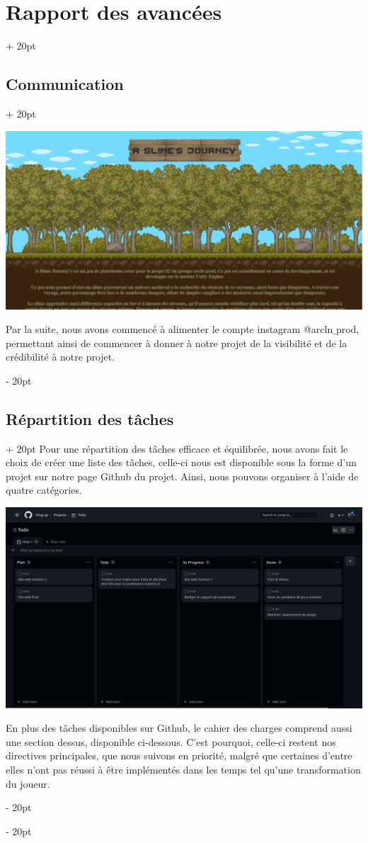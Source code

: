 \documentclass[a4paper, 12pt, twoside]{article}
\newcommand{\ind}[1][20pt]{\advance\leftskip + #1}
\newcommand{\deind}[1][20pt]{\advance\leftskip - #1}
\newenvironment{indt}[2][20pt]{#2 \par \ind[#1]}{\par \deind} %
\begin{document}
\begin{indt}{\section{Rapport des avancées}}
\begin{indt}{\subsection{Communication}}
            \begin{center}
                \includegraphics[width=0.8\linewidth]{Site.png}
            \end{center}

            Par la suite, nous avons commencé à alimenter le compte instagram @arcln$\_$prod, permettant ainsi de commencer à donner à notre projet de la visibilité et de la crédibilité à notre projet.

        \end{indt}

        \begin{indt}{\subsection{Répartition des tâches}}
            Pour une répartition des tâches efficace et équilibrée, nous avons fait le choix de créer une liste des tâches, celle-ci nous est disponible sous la forme d'un projet sur notre page Github du projet. Ainsi, nous pouvons organiser à l'aide de quatre catégories.
        
            \begin{center}
                \includegraphics[width=0.8\linewidth]{EDT.png}
            \end{center}

            En plus des tâches disponibles sur Github, le cahier des charges comprend aussi une section dessus, disponible ci-dessous. C'est pourquoi, celle-ci restent nos directives principales, que nous suivons en priorité, malgré que certaines d'entre elles n'ont pas réussi à être implémentés dans les temps tel qu'une transformation du joueur.
        

\end{indt}
\end{indt}
\end{document}
